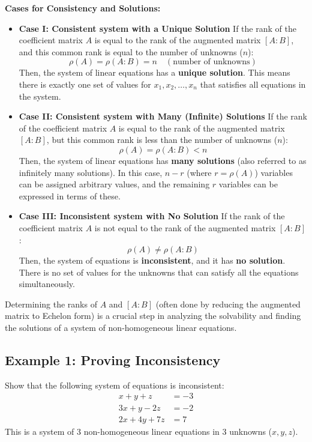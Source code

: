\documentclass{article}
\begin{document}
\textbf{Cases for Consistency and Solutions:}
\begin{itemize}
    \item \textbf{Case I: Consistent system with a Unique Solution}
    If the rank of the coefficient matrix $A$ is equal to the rank of the augmented matrix $[A:B]$, and this common rank is equal to the number of unknowns ($n$):
    \[ \rho(A) = \rho(A:B) = n \quad (\text{number of unknowns}) \]
    Then, the system of linear equations has a \textbf{unique solution}. This means there is exactly one set of values for $x_1, x_2, \dots, x_n$ that satisfies all equations in the system.

    \item \textbf{Case II: Consistent system with Many (Infinite) Solutions}
    If the rank of the coefficient matrix $A$ is equal to the rank of the augmented matrix $[A:B]$, but this common rank is less than the number of unknowns ($n$):
    \[ \rho(A) = \rho(A:B) < n \]
    Then, the system of linear equations has \textbf{many solutions} (also referred to as infinitely many solutions). In this case, $n - r$ (where $r = \rho(A)$) variables can be assigned arbitrary values, and the remaining $r$ variables can be expressed in terms of these.

    \item \textbf{Case III: Inconsistent system with No Solution}
    If the rank of the coefficient matrix $A$ is not equal to the rank of the augmented matrix $[A:B]$:
    \[ \rho(A) \neq \rho(A:B) \]
    Then, the system of equations is \textbf{inconsistent}, and it has \textbf{no solution}. There is no set of values for the unknowns that can satisfy all the equations simultaneously.
\end{itemize}
Determining the ranks of $A$ and $[A:B]$ (often done by reducing the augmented matrix to Echelon form) is a crucial step in analyzing the solvability and finding the solutions of a system of non-homogeneous linear equations.

\subsection{Example 1: Proving Inconsistency} %
Show that the following system of equations is inconsistent:
\begin{align*} x + y + z &= -3 \\ 3x + y - 2z &= -2 \\ 2x + 4y + 7z &= 7 \end{align*}
This is a system of 3 non-homogeneous linear equations in 3 unknowns ($x, y, z$).
\end{document}

